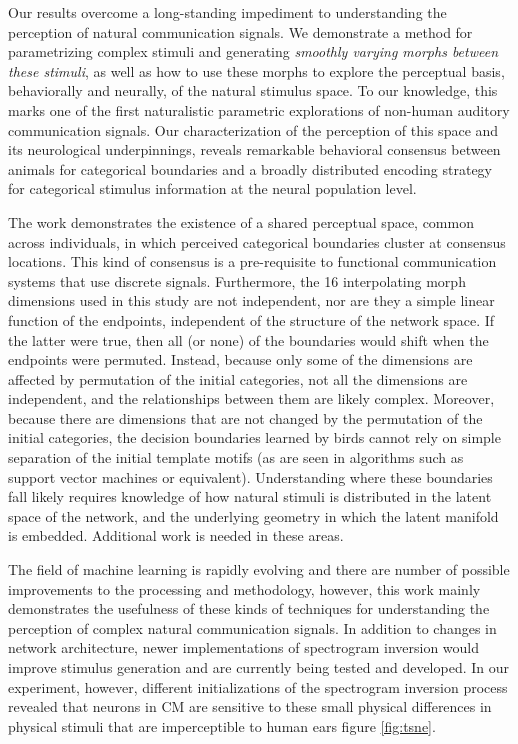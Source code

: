 Our results overcome a long-standing impediment to understanding the perception of natural communication signals. We demonstrate a method for parametrizing complex stimuli and generating \emph{smoothly varying morphs between these stimuli}, as well as how to use these morphs to explore the perceptual basis, behaviorally and neurally, of the natural stimulus space. To our knowledge, this marks one of the first naturalistic parametric explorations of non-human auditory communication signals. Our characterization of the perception of this space and its neurological underpinnings, reveals remarkable behavioral consensus between animals for categorical boundaries and a broadly distributed encoding strategy for categorical stimulus information at the neural population level.  

The work demonstrates the existence of a shared perceptual space, common across individuals, in which perceived categorical boundaries cluster at consensus locations.  This kind of consensus is a pre-requisite to functional communication systems that use discrete signals.  Furthermore, the 16 interpolating morph dimensions used in this study are not independent, nor are they a simple linear function of the endpoints, independent of the structure of the network space. If the latter were true, then all (or none) of the boundaries would shift when the endpoints were permuted. Instead, because only some of the dimensions are affected by permutation of the initial categories, not all the dimensions are independent, and the relationships between them are likely complex. Moreover, because there are dimensions that are not changed by the permutation of the initial categories, the decision boundaries learned by birds cannot rely on simple separation of the initial template motifs (as are seen in algorithms such as support vector machines or equivalent). Understanding where these boundaries fall likely requires knowledge of how natural stimuli is distributed in the latent space of the network, and the underlying geometry in which the latent manifold is embedded. Additional work is needed in these areas. \cite{tims paper}


The field of machine learning is rapidly evolving and there are number of possible improvements to the processing and methodology, however, this work mainly demonstrates the usefulness of these kinds of techniques for understanding the perception of complex natural communication signals. In addition to changes in network architecture, newer implementations of spectrogram inversion would improve stimulus generation and are currently being tested and developed. In our experiment, however, different initializations of the spectrogram inversion process revealed that neurons in \ac{CM} are sensitive to these small physical differences in physical stimuli that are imperceptible to human ears figure \ref{fig:tsne}.

